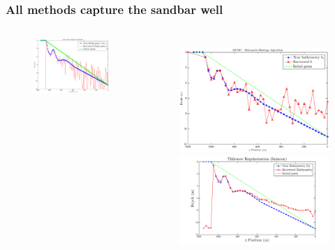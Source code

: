 \documentclass[7pt]{beamer}
\begin{document}
\begin{frame}
	\frametitle{All methods capture the sandbar well}
	 \begin{columns}
			\begin{figure}[H]
	 			\centering
				\includegraphics[width=1\linewidth]{img/nllsq_synthetic_1.eps}
			\end{figure}
			\begin{figure}[H]
	 			\includegraphics[width=1\linewidth]{img/MCMC-manufactured.eps}\vfill
				\includegraphics[width=1\linewidth]{img/fmincon_simulated_25m.png}

\end{figure}
\end{columns}
\end{frame}
\end{document}
